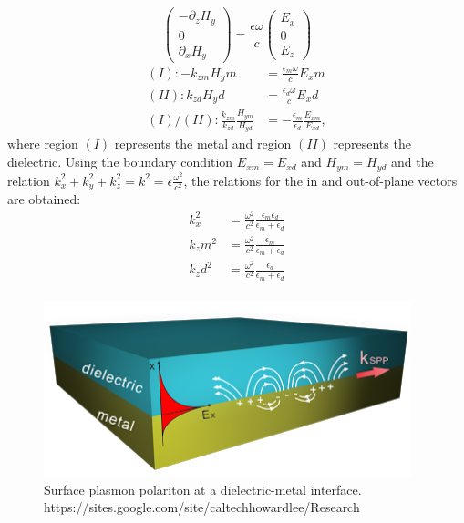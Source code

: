\begin{equation}
\begin{pmatrix}-\partial_zH_y\\0\\\partial_xH_y\end{pmatrix}
= \frac{\epsilon\omega}{c}
\begin{pmatrix}E_x\\0\\E_z\end{pmatrix}
\end{equation}
\begin{equation}
\begin{split}
(I): -k_{zm}H_ym &= \frac{\epsilon_m\omega}{c}E_xm \\
(II): k_{zd}H_yd &= \frac{\epsilon_d\omega}{c}E_xd \\
(I)/(II): \frac{k_{zm}}{k_{zd}}\frac{H_{ym}}{H_{yd}} &=-\frac{\epsilon_m}{\epsilon_d}\frac{E_{xm}}{E_{xd}},
\end{split}
\end{equation}
where region $(I)$ represents the metal and region $(II)$ represents the dielectric. Using the boundary condition $E_{xm} = E_{xd}$ and $H_{ym} = H_{yd}$ and the relation $k_x^2+k_y^2+k_z^2 = k^2 = \epsilon\frac{\omega^2}{c^2}$, the relations for the in and out-of-plane vectors are obtained:
\begin{equation}
\begin{split}
k_x^2 &= \frac{\omega^2}{c^2}\frac{\epsilon_m\epsilon_d}{\epsilon_m+\epsilon_d}\\
k_zm^2 &= \frac{\omega^2}{c^2}\frac{\epsilon_m}{\epsilon_m+\epsilon_d}\\
k_zd^2 &= \frac{\omega^2}{c^2}\frac{\epsilon_d}{\epsilon_m+\epsilon_d}\\
\end{split}
\end{equation}
\begin{figure}[t!]
\centering
\includegraphics[width=0.95\textwidth]{SPP.png}
\caption{Surface plasmon polariton at a dielectric-metal interface. https://sites.google.com/site/caltechhowardlee/Research}
\end{figure}

